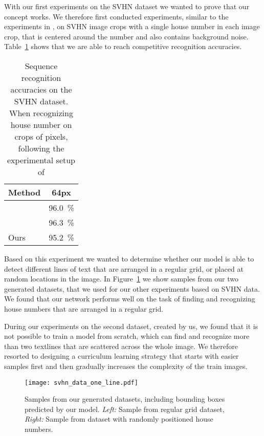 \documentclass[letterpaper]{article}
\begin{document}
	With our first experiments on the SVHN dataset \cite{Netzer2011Reading} we wanted to prove that our concept works.
	We therefore first conducted experiments, similar to the experiments in \cite{Jaderberg2015Spatial}, on SVHN image crops with a single house number in each image crop, that is centered around the number and also contains background noise.
	Table~\ref{tab:svhn_results} shows that we are able to reach competitive recognition accuracies.

	\begin{table}
		\begin{center}
			\begin{tabular}{|l|c|}
				\hline
				Method & 64px \\
				\hline
				\cite{Goodfellow2014MultiDigit} & \SI{96.0}{\percent} \\
				\cite{Jaderberg2015Spatial} & \SI{96.3}{\percent} \\
				\hline
				Ours & \SI{95.2}{\percent} \\
				\hline
			\end{tabular}
		\end{center}
		\caption{Sequence recognition accuracies on the SVHN dataset. When recognizing house number on crops of  pixels, following the experimental setup of \cite{Goodfellow2014MultiDigit}}
		\label{tab:svhn_results}
	\end{table}

	Based on this experiment we wanted to determine whether our model is able to detect different lines of text that are arranged in a regular grid, or placed at random locations in the image.
	In Figure~\ref{fig:svhn_grid_dataset} we show samples from our two generated datasets, that we used for our other experiments based on SVHN data.
	We found that our network performs well on the task of finding and recognizing house numbers that are arranged in a regular grid.

	During our experiments on the second dataset, created by us, we found that it is not possible to train a model from scratch, which can find and recognize more than two textlines that are scattered across the whole image.
	We therefore resorted to designing a curriculum learning strategy that starts with easier samples first and then gradually increases the complexity of the train images.

	\begin{figure}[t]
		\centering
		\texttt{[image: svhn\_data\_one\_line.pdf]}
		\caption{Samples from our generated datasets, including bounding boxes predicted by our model. \textit{Left:} Sample from regular grid dataset, \textit{Right:} Sample from dataset with randomly positioned house numbers.}
		\label{fig:svhn_grid_dataset}
	\end{figure}
\end{document}
